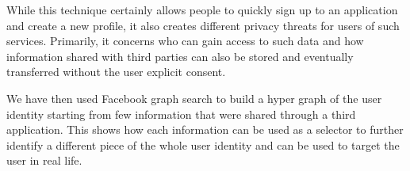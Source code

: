While this technique certainly allows people to quickly sign up to an application and create a new profile, it also creates different privacy threats for users of such services. Primarily, it concerns who can gain access to such data and how information shared with third parties can also be stored and eventually transferred without the user explicit consent.

We have then used Facebook graph search to build a hyper graph of the user identity starting from few information that were shared through a third application. This shows how each information can be used as a selector to further identify a different piece of the whole user identity and can be used to target the user in real life.

